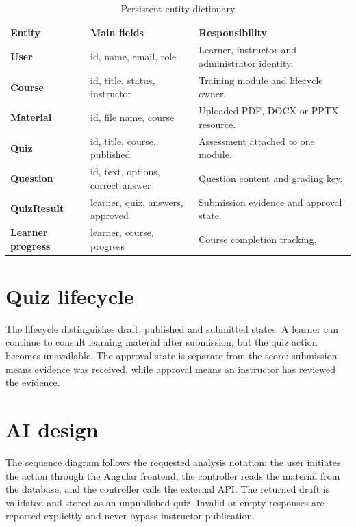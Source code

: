 \begin{table}[H]\centering
\caption{Persistent entity dictionary}\label{tab:data-dictionary}
\begin{tabularx}{\textwidth}{>{\bfseries}p{}p{}X}
\toprule Entity & Main fields & Responsibility\\\midrule
User & id, name, email, role & Learner, instructor and administrator identity.\\
Course & id, title, status, instructor & Training module and lifecycle owner.\\
Material & id, file name, course & Uploaded PDF, DOCX or PPTX resource.\\
Quiz & id, title, course, published & Assessment attached to one module.\\
Question & id, text, options, correct answer & Question content and grading key.\\
QuizResult & learner, quiz, answers, approved & Submission evidence and approval state.\\
Learner progress & learner, course, progress & Course completion tracking.\\
\bottomrule
\end{tabularx}
\end{table}


\section{Quiz lifecycle}
The lifecycle distinguishes draft, published and submitted states. A learner
can continue to consult learning material after submission, but the quiz
action becomes unavailable. The approval state is separate from the score:
submission means evidence was received, while approval means an instructor has
reviewed the evidence.

\section{AI design}
The sequence diagram follows the requested analysis notation: the user
initiates the action through the Angular frontend, the controller reads the
material from the database, and the controller calls the external API. The
returned draft is validated and stored as an unpublished quiz. Invalid or
empty responses are reported explicitly and never bypass instructor
publication.

